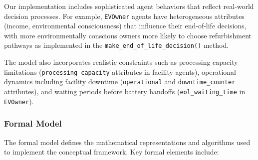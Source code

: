 Our implementation includes sophisticated agent behaviors that reflect real-world decision processes. For example, \texttt{EVOwner} agents have heterogeneous attributes (income, environmental consciousness) that influence their end-of-life decisions, with more environmentally conscious owners more likely to choose refurbishment pathways as implemented in the \texttt{make\_end\_of\_life\_decision()} method.

The model also incorporates realistic constraints such as processing capacity limitations (\texttt{processing\_capacity} attributes in facility agents), operational dynamics including facility downtime (\texttt{operational} and \texttt{downtime\_counter} attributes), and waiting periods before battery handoffs (\texttt{eol\_waiting\_time} in \texttt{EVOwner}).

\subsubsection{Formal Model}
The formal model defines the mathematical representations and algorithms used to implement the conceptual framework. Key formal elements include:

